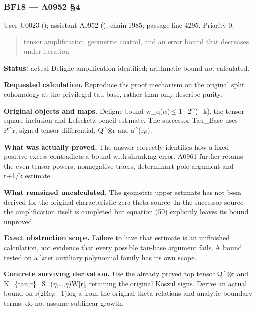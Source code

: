 \documentclass[10pt,a4paper,oneside]{report}
\begin{document}
\subsubsection{BF18 --- A0952 §4}\label{bf18-a0952-4}

User U0023 (\protect{});
assistant A0952 (\protect{}),
chain 1985; passage line 4295. Priority 0.

\begin{quote}
tensor amplification, geometric control, and an error bound that
decreases under iteration
\end{quote}

\textbf{Status:} actual Deligne amplification identified; arithmetic
bound not calculated.

\textbf{Requested calculation.} Reproduce the proof mechanism on the
original split cohomology at the privileged tau base, rather than only
describe purity.

\textbf{Original objects and maps.} Deligne bound
w\_q(\allowbreak{}\ensuremath{α}\allowbreak{})\allowbreak{}\ensuremath{≤}\allowbreak{}1+2\textasciicircum{}(\allowbreak{}\ensuremath{−}\allowbreak{}k),
the tensor-square inclusion and Lefschetz-pencil estimate. The successor
Tau\_Base uses P\^{}r, signed tensor differential,
Q\textasciicircum{}\allowbreak{}\ensuremath{⊗}\allowbreak{}r and
a\textasciicircum{}(r\allowbreak{}\ensuremath{ρ}\allowbreak{}).

\textbf{What was actually proved.} The answer correctly identifies how a
fixed positive excess contradicts a bound with shrinking error. A0961
further retains the even tensor powers, nonnegative traces, determinant
pole argument and r+1/k estimate.

\textbf{What remained uncalculated.} The geometric upper estimate has
not been derived for the original characteristic-zero theta source. In
the successor source the amplification itself is completed but equation
(50) explicitly leaves its bound unproved.

\textbf{Exact obstruction scope.} Failure to have that estimate is an
unfinished calculation, not evidence that every possible tau-base
argument fails. A bound tested on a later auxiliary polynomial family
has its own scope.

\textbf{Concrete surviving derivation.} Use the already proved top
tensor Q\textasciicircum{}\allowbreak{}\ensuremath{⊗}\allowbreak{}r and
K\_\{tau,r\}=S\_(\allowbreak{}\ensuremath{η}\allowbreak{},…,\allowbreak{}\ensuremath{η}\allowbreak{})W[r],
retaining the original Koszul signs. Derive an actual bound on
r(2Re\allowbreak{}\ensuremath{ρ}\allowbreak{}\allowbreak{}\ensuremath{−}\allowbreak{}1)log
a from the original theta relations and analytic boundary terms; do not
assume sublinear growth.
\end{document}
